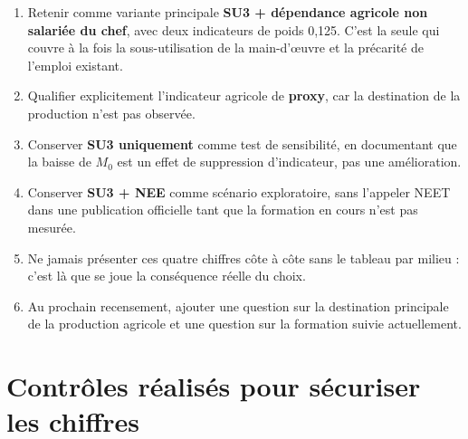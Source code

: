 \documentclass[11pt,a4paper]{article}
\begin{document}
\begin{enumerate}
  \item Retenir comme variante principale \textbf{SU3 + dépendance agricole non salariée du
  chef}, avec deux indicateurs de poids 0,125. C'est la seule qui couvre à la fois la
  sous-utilisation de la main-d'{\oe}uvre et la précarité de l'emploi existant.
  \item Qualifier explicitement l'indicateur agricole de \textbf{proxy}, car la destination de la
  production n'est pas observée.
  \item Conserver \textbf{SU3 uniquement} comme test de sensibilité, en documentant que la baisse
  de $M_0$ est un effet de suppression d'indicateur, pas une amélioration.
  \item Conserver \textbf{SU3 + NEE} comme scénario exploratoire, sans l'appeler NEET dans une
  publication officielle tant que la formation en cours n'est pas mesurée.
  \item Ne jamais présenter ces quatre chiffres côte à côte sans le tableau par milieu : c'est
  là que se joue la conséquence réelle du choix.
  \item Au prochain recensement, ajouter une question sur la destination principale de la
  production agricole et une question sur la formation suivie actuellement.
\end{enumerate}

\section{Contrôles réalisés pour sécuriser les chiffres}
\end{document}
